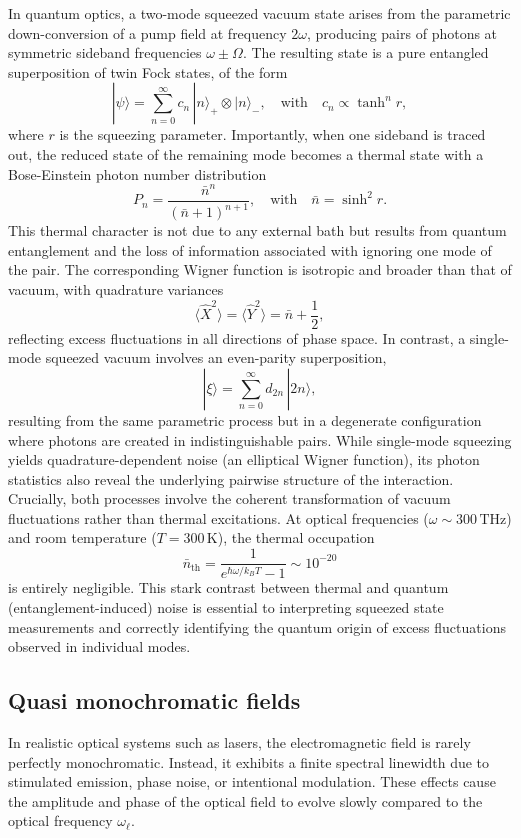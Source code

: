 In quantum optics, a two-mode squeezed vacuum state arises from the parametric down-conversion of a pump field at frequency \(2\omega\), producing pairs of photons at symmetric sideband frequencies \(\omega \pm \Omega\). The resulting state is a pure entangled superposition of twin Fock states, of the form
\[
|\psi\rangle = \sum_{n=0}^{\infty} c_n\, |n\rangle_+ \otimes |n\rangle_- , \quad \text{with} \quad c_n \propto \tanh^n r,
\]
where \(r\) is the squeezing parameter. Importantly, when one sideband is traced out, the reduced state of the remaining mode becomes a thermal state with a Bose-Einstein photon number distribution
\[
P_n = \frac{\bar{n}^n}{(\bar{n} + 1)^{n+1}}, \quad \text{with} \quad \bar{n} = \sinh^2 r.
\]
This thermal character is not due to any external bath but results from quantum entanglement and the loss of information associated with ignoring one mode of the pair. The corresponding Wigner function is isotropic and broader than that of vacuum, with quadrature variances
\[
\langle \hat{X}^2 \rangle = \langle \hat{Y}^2 \rangle = \bar{n} + \frac{1}{2},
\]
reflecting excess fluctuations in all directions of phase space. In contrast, a single-mode squeezed vacuum involves an even-parity superposition,
\[
|\xi\rangle = \sum_{n=0}^{\infty} d_{2n}\, |2n\rangle,
\]
resulting from the same parametric process but in a degenerate configuration where photons are created in indistinguishable pairs. While single-mode squeezing yields quadrature-dependent noise (an elliptical Wigner function), its photon statistics also reveal the underlying pairwise structure of the interaction. Crucially, both processes involve the coherent transformation of vacuum fluctuations rather than thermal excitations. At optical frequencies (\(\omega \sim 300\,\mathrm{THz}\)) and room temperature (\(T = 300\,\mathrm{K}\)), the thermal occupation
\[
\bar{n}_{\text{th}} = \frac{1}{e^{\hbar \omega / k_B T} - 1} \sim 10^{-20}
\]
is entirely negligible. This stark contrast between thermal and quantum (entanglement-induced) noise is essential to interpreting squeezed state measurements and correctly identifying the quantum origin of excess fluctuations observed in individual modes.



\subsection*{Quasi monochromatic fields } 
In realistic optical systems such as lasers, the electromagnetic field is rarely perfectly monochromatic. Instead, it exhibits a finite spectral linewidth due to stimulated emission, phase noise, or intentional modulation. These effects cause the amplitude and phase of the optical field to evolve slowly compared to the optical frequency $\omega_\ell$. \\


